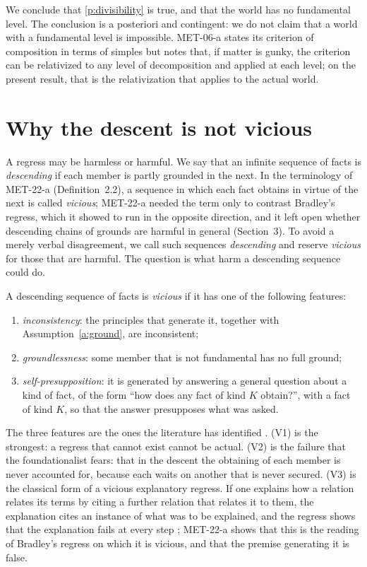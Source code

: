 \documentclass{situationist-preprint}
\begin{document}
We conclude that \ref{p:divisibility} is true, and that the world has no fundamental level. The conclusion is a posteriori and contingent: we do not claim that a world with a fundamental level is impossible. MET-06-a states its criterion of composition in terms of simples but notes that, if matter is gunky, the criterion can be relativized to any level of decomposition and applied at each level; on the present result, that is the relativization that applies to the actual world.

\section{Why the descent is not vicious}\label{s:vicious}

A regress may be harmless or harmful. We say that an infinite sequence of facts is \emph{descending} if each member is partly grounded in the next. In the terminology of MET-22-a (Definition~2.2), a sequence in which each fact obtains in virtue of the next is called \emph{vicious}; MET-22-a needed the term only to contrast Bradley's regress, which it showed to run in the opposite direction, and it left open whether descending chains of grounds are harmful in general (Section~3). To avoid a merely verbal disagreement, we call such sequences \emph{descending} and reserve \emph{vicious} for those that are harmful. The question is what harm a descending sequence could do.

\begin{definition}\label{d:vicious}
A descending sequence of facts is \emph{vicious} if it has one of the following features:
\begin{enumerate}[label=(V\arabic*)]
\item \emph{inconsistency}: the principles that generate it, together with Assumption~\ref{a:ground}, are inconsistent;
\item \emph{groundlessness}: some member that is not fundamental has no full ground;
\item \emph{self-presupposition}: it is generated by answering a general question about a kind of fact, of the form \enquote{how does any fact of kind $K$ obtain?}, with a fact of kind $K$, so that the answer presupposes what was asked.
\end{enumerate}
\end{definition}

The three features are the ones the literature has identified \citep{Nolan2001,Bliss2013}. (V1) is the strongest: a regress that cannot exist cannot be actual. (V2) is the failure that the foundationalist fears: that in the descent the obtaining of each member is never accounted for, because each waits on another that is never secured. (V3) is the classical form of a vicious explanatory regress. If one explains how a relation relates its terms by citing a further relation that relates it to them, the explanation cites an instance of what was to be explained, and the regress shows that the explanation fails at every step \citep{Nolan2001}; MET-22-a shows that this is the reading of Bradley's regress on which it is vicious, and that the premise generating it is false.
\end{document}
